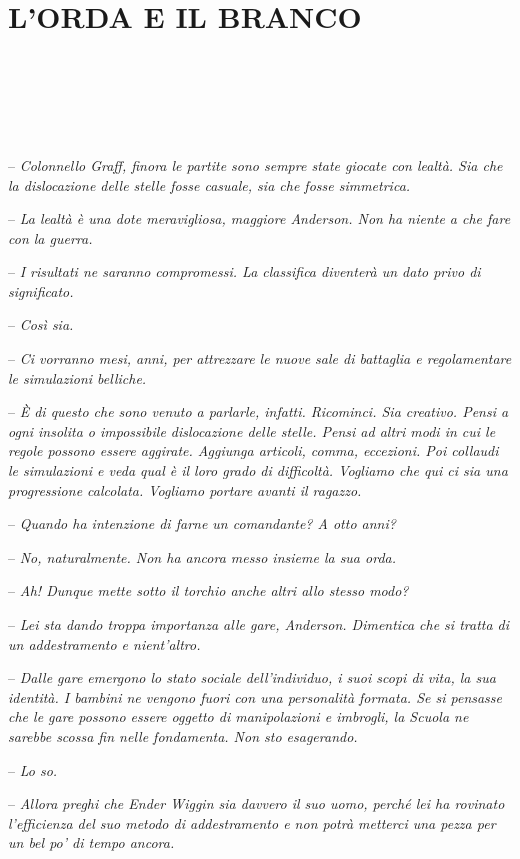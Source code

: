 \chapter{L'ORDA E IL BRANCO}

{~}

{~}

{~}

{-- \emph{Colonnello Graff, finora le partite sono sempre state giocate
		con lealtà. Sia che la dislocazione delle stelle fosse casuale, sia che
		fosse simmetrica.}}

{-- \emph{La lealtà è una dote meravigliosa, maggiore Anderson. Non ha
		niente a che fare con la guerra.}}

{-- \emph{I risultati ne saranno compromessi. La classifica diventerà un
		dato privo di significato.}}

{-- \emph{Così sia.}}

{-- \emph{Ci vorranno mesi, anni, per attrezzare le nuove sale di
		battaglia e regolamentare le simulazioni belliche.}}

{-- \emph{È di questo che sono venuto a parlarle, infatti. Ricominci.
		Sia creativo. Pensi a ogni insolita o impossibile dislocazione delle
		stelle. Pensi ad altri modi in cui le regole possono essere aggirate.
		Aggiunga articoli, comma, eccezioni. Poi collaudi le simulazioni e veda
		qual è il loro grado di difficoltà. Vogliamo che qui ci sia una
		progressione calcolata. Vogliamo portare avanti il ragazzo.}}

{-- \emph{Quando ha intenzione di farne un comandante? A otto anni?}}

{-- \emph{No, naturalmente. Non ha ancora messo insieme la sua orda.}}

{-- \emph{Ah! Dunque mette sotto il torchio anche altri allo stesso
		modo?}}

{-- \emph{Lei sta dando troppa importanza alle gare, Anderson. Dimentica
		che si tratta di un addestramento e nient'altro.}}

{-- \emph{Dalle gare emergono lo stato sociale dell'individuo, i suoi
		scopi di vita, la sua identità. I bambini ne vengono fuori con una
		personalità formata. Se si pensasse che le gare possono essere oggetto
		di manipolazioni e imbrogli, la Scuola ne sarebbe scossa fin nelle
		fondamenta. Non sto esagerando.}}

{-- \emph{Lo so.}}

{-- \emph{Allora preghi che Ender Wiggin sia davvero il suo uomo, perché
		lei ha rovinato l'efficienza del suo metodo di addestramento e non potrà
		metterci una pezza per un bel po' di tempo ancora.}}

